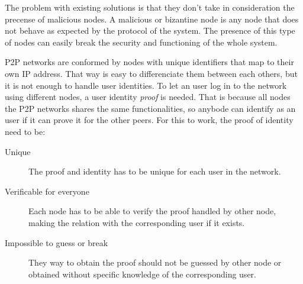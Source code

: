 The problem with existing solutions is that they don't take in consideration the
precense of malicious nodes. A malicious or bizantine node is any node that does
not behave as expected by the protocol of the system. The presence of this type
of nodes can easily break the security and functioning of the whole system.


P2P networks are conformed by nodes with unique identifiers that map to their
own IP address. That way is easy to differenciate them between each others, but
it is not enough to handle user identities. To let an user log in to the
network using different nodes, a user identity \textit{proof} is needed. That
is because all nodes the P2P networks shares the same functionalities, so
anybode can identify as an user if it can prove it for the other peers. For
this to work, the proof of identity need to be:
\begin{description}
  \item[Unique] The proof and identity has to be unique for each user in the network.

  \item[Verificable for everyone]  Each node has to be able to verify the proof
    handled by other node, making the relation with the corresponding user if it
    exists.
  \item[Impossible to guess or break] They way to obtain the proof should not
    be guessed by other node or obtained without specific knowledge of the
    corresponding user.
\end{description}





